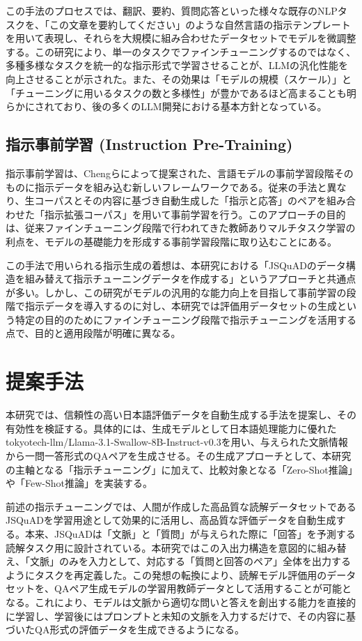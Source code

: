 \documentclass[twocolumn]{jsarticle}
\begin{document}
この手法のプロセスでは、翻訳、要約、質問応答といった様々な既存のNLPタスクを、「この文章を要約してください」のような自然言語の指示テンプレートを用いて表現し、それらを大規模に組み合わせたデータセットでモデルを微調整する。この研究により、単一のタスクでファインチューニングするのではなく、多種多様なタスクを統一的な指示形式で学習させることが、LLMの汎化性能を向上させることが示された。また、その効果は「モデルの規模（スケール）」と「チューニングに用いるタスクの数と多様性」が豊かであるほど高まることも明らかにされており、後の多くのLLM開発における基本方針となっている。

\subsection{指示事前学習 (Instruction Pre-Training)}
指示事前学習は、Chengら\cite{Instruction Pre-Training}によって提案された、言語モデルの事前学習段階そのものに指示データを組み込む新しいフレームワークである。従来の手法と異なり、生コーパスとその内容に基づき自動生成した「指示と応答」のペアを組み合わせた「指示拡張コーパス」を用いて事前学習を行う。このアプローチの目的は、従来ファインチューニング段階で行われてきた教師ありマルチタスク学習の利点を、モデルの基礎能力を形成する事前学習段階に取り込むことにある。

この手法で用いられる指示生成の着想は、本研究における「JSQuADのデータ構造を組み替えて指示チューニングデータを作成する」というアプローチと共通点が多い。しかし、この研究がモデルの汎用的な能力向上を目指して事前学習の段階で指示データを導入するのに対し、本研究では評価用データセットの生成という特定の目的のためにファインチューニング段階で指示チューニングを活用する点で、目的と適用段階が明確に異なる。



\section{提案手法}

本研究では、信頼性の高い日本語評価データを自動生成する手法を提案し、その有効性を検証する。具体的には、生成モデルとして日本語処理能力に優れたtokyotech-llm/Llama-3.1-Swallow-8B-Instruct-v0.3\cite{Fujii:COLM2024}\cite{Okazaki:COLM2024}\cite{ma:arxiv2025}を用い、与えられた文脈情報から一問一答形式のQAペアを生成させる。その生成アプローチとして、本研究の主軸となる「指示チューニング」\cite{Instruction-Tuning}に加えて、比較対象となる「Zero-Shot推論」や「Few-Shot推論」を実装する。

前述の指示チューニングでは、人間が作成した高品質な読解データセットであるJSQuAD\cite{JGLUE}を学習用途として効果的に活用し、高品質な評価データを自動生成する。本来、JSQuADは「文脈」と「質問」が与えられた際に「回答」を予測する読解タスク用に設計されている。本研究ではこの入出力構造を意図的に組み替え、「文脈」のみを入力として、対応する「質問と回答のペア」全体を出力するようにタスクを再定義した。この発想の転換により、読解モデル評価用のデータセットを、QAペア生成モデルの学習用教師データとして活用することが可能となる。これにより、モデルは文脈から適切な問いと答えを創出する能力を直接的に学習し、学習後にはプロンプトと未知の文脈を入力するだけで、その内容に基づいたQA形式の評価データを生成できるようになる。
\end{document}
